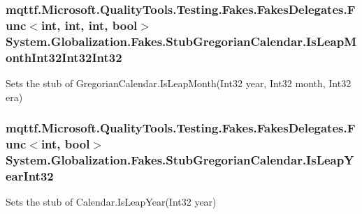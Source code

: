 \hypertarget{class_system_1_1_globalization_1_1_fakes_1_1_stub_gregorian_calendar_ae21c49853011a60729f427f8c0b19943}{
\subsubsection[{Is\-Leap\-Month\-Int32\-Int32\-Int32}]{\setlength{\rightskip}{0pt plus 5cm}mqttf.\-Microsoft.\-Quality\-Tools.\-Testing.\-Fakes.\-Fakes\-Delegates.\-Func$<$int, int, int, bool$>$ System.\-Globalization.\-Fakes.\-Stub\-Gregorian\-Calendar.\-Is\-Leap\-Month\-Int32\-Int32\-Int32}}\label{class_system_1_1_globalization_1_1_fakes_1_1_stub_gregorian_calendar_ae21c49853011a60729f427f8c0b19943}


Sets the stub of Gregorian\-Calendar.\-Is\-Leap\-Month(\-Int32 year, Int32 month, Int32 era)

\hypertarget{class_system_1_1_globalization_1_1_fakes_1_1_stub_gregorian_calendar_a8a428ce56de424511a1579af7ddf916d}{
\subsubsection[{Is\-Leap\-Year\-Int32}]{\setlength{\rightskip}{0pt plus 5cm}mqttf.\-Microsoft.\-Quality\-Tools.\-Testing.\-Fakes.\-Fakes\-Delegates.\-Func$<$int, bool$>$ System.\-Globalization.\-Fakes.\-Stub\-Gregorian\-Calendar.\-Is\-Leap\-Year\-Int32}}\label{class_system_1_1_globalization_1_1_fakes_1_1_stub_gregorian_calendar_a8a428ce56de424511a1579af7ddf916d}


Sets the stub of Calendar.\-Is\-Leap\-Year(\-Int32 year)

